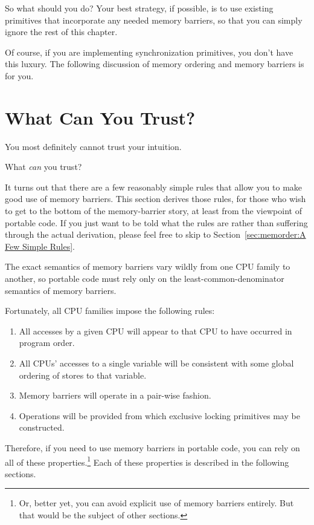 So what should you do?
Your best strategy, if possible, is to use existing primitives that
incorporate any needed memory barriers, so that you can simply ignore
the rest of this chapter.

Of course, if you are implementing synchronization primitives,
you don't have this luxury.
The following discussion of memory ordering and memory barriers
is for you.

\section{What Can You Trust?}
\label{sec:memorder:What Can You Trust?}

You most definitely cannot trust your intuition.

What \emph{can} you trust?

It turns out that there are a few reasonably simple rules that
allow you to make good use of memory barriers.
This section derives those rules, for those who wish to get
to the bottom of the memory-barrier story, at least from the viewpoint
of portable code.
If you just want to be told what the rules are rather than suffering
through the actual derivation,
please feel free to skip to Section~\ref{sec:memorder:A Few Simple Rules}.

The exact semantics of memory barriers vary wildly from one CPU family to
another, so portable code must rely only on the least-common-denominator
semantics of memory barriers.

Fortunately, all CPU families impose the following rules:
\begin{enumerate}
\item	All accesses by a given CPU will appear to that CPU to have
	occurred in program order.
\item	All CPUs' accesses to a single variable will be consistent with
	some global ordering of stores to that variable.
\item	Memory barriers will operate in a pair-wise fashion.
\item	Operations will be provided from which exclusive locking
	primitives may be constructed.
\end{enumerate}

Therefore, if you need to use memory barriers in portable code,
you can rely on all of these properties.\footnote{
	Or, better yet, you can avoid explicit use of memory barriers
	entirely.
	But that would be the subject of other sections.}
Each of these properties is described in the following sections.

